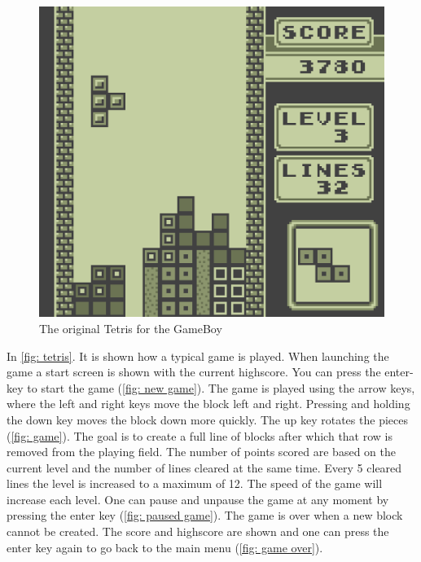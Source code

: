 \begin{figure}[H]
    \centering
    \includegraphics[width = 0.5 \textwidth]{Figures/day_5/gb_tetris.png}
    \caption{The original Tetris for the GameBoy}
    \label{fig: tetris gb}
\end{figure}

In \cref{fig: tetris}. It is shown how a typical game is played. When launching the game a start screen is shown with the current highscore. You can press the enter-key to start the game (\cref{fig: new game}). The game is played using the arrow keys, where the left and right keys move the block left and right. Pressing and holding the down key moves the block down more quickly. The up key rotates the pieces (\cref{fig: game}). The goal is to create a full line of blocks after which that row is removed from the playing field. The number of points scored are based on the current level and the number of lines cleared at the same time. Every 5 cleared lines the level is increased to a maximum of 12. The speed of the game will increase each level. One can pause and unpause the game at any moment by pressing the enter key (\cref{fig: paused game}). The game is over when a new block cannot be created. The score and highscore are shown and one can press the enter key again to go back to the main menu (\cref{fig: game over}).


